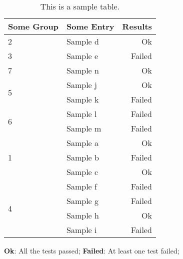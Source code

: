 \begin{table}[t]
\centering
\scriptsize

\begin{threeparttable}
	\caption{This is a sample table. \vspace{-2mm}}
	\label{tbl:example}
	\begin{tabular}{llr}
		\toprule
		\bfseries{Some Group} & \bfseries{Some Entry} & \bfseries{Results}  \\

		\toprule
		2                             & Sample d          & Ok    \\
		\midrule
		3                             & Sample e          & Failed    \\
		\midrule
		7                             & Sample n          & Ok    \\
		\midrule
		\multirow{2}{*}{5}            & Sample j          & Ok    \\
		                              & Sample k          & Failed    \\
		\midrule
		\multirow{2}{*}{6}            & Sample l          & Failed    \\
		                              & Sample m          & Failed    \\
		\midrule
		\multirow{3}{*}{1}            & Sample a          & Ok    \\
		                              & Sample b          & Failed    \\
		                              & Sample c          & Ok    \\
		\midrule
		\multirow{4}{*}{4}            & Sample f          & Failed    \\
		                              & Sample g          & Failed    \\
		                              & Sample h          & Ok    \\
		                              & Sample i          & Failed    \\

		\bottomrule
	\end{tabular}


	\begin{tablenotes}
	\item \textbf{Ok}: All the tests passed; \textbf{Failed}: At least one test failed;
	\end{tablenotes}
	\vspace{-3mm}
\end{threeparttable}
\end{table}
